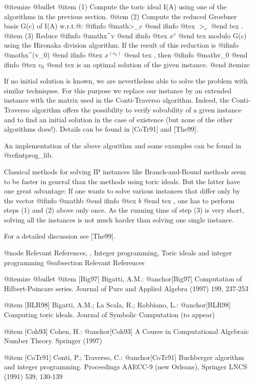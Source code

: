 @itemize @bullet
@item (1) Compute the toric ideal I(A) using one of the algorithms in the previous section.
@item (2) Compute the reduced Groebner basis G(c) of I(A) w.r.t.@: 
@ifinfo
@math{>_c}
@end ifinfo
@tex
$>_c$
@end tex
.
@item (3) Reduce 
@ifinfo
@math{x^v}
@end ifinfo
@tex
$x^v$
@end tex
 modulo G(c) using the Hironaka division algorithm.
If the result of this reduction is 
@ifinfo
@math{x^(v_0)}
@end ifinfo
@tex
$x^(v_0)$
@end tex
, then 
@ifinfo
@math{v_0}
@end ifinfo
@tex
$v_0$
@end tex
 is an optimal
solution of the given instance.
@end itemize

If no initial solution is known, we are nevertheless able to solve the
problem with similar techniques. For this purpose we replace our
instance by an extended instance with the matrix used
in the Conti-Traverso algorithm. Indeed, the Conti-Traverso
algorithm offers the possibility to verify solvability of a given
instance and to find an initial solution in the case of existence (but
none of the other algorithms does!). Details can be found in [CoTr91]
and [The99].

An implementation of the above algorithm and some examples can be found in @ref{intprog_lib}.

Classical methods for solving IP instances like Branch-and-Bound
methods seem to be faster in general than the methods using toric
ideals. But the latter have one great advantage: If one wants to solve
various instances that differ only by the vector 
@ifinfo
@math{b}
@end ifinfo
@tex
$b$
@end tex
, one has to
perform steps (1) and (2) above only once. As the running time of step (3)
is very short, solving all the instances is not much harder than
solving one single instance.

For a detailed discussion see [The99].

@node Relevant References, , Integer programming, Toric ideals and integer programming
@subsection Relevant References

@itemize @bullet
@item [Big97]  Bigatti, A.M.: @anchor{[Big97]}
   Computation of Hilbert-Poincare series.
   Journal of Pure and Applied Algebra (1997) 199, 237-253

@item [BLR98]  Bigatti, A.M.; La Scala, R.; Robbiano, L.: @anchor{[BLR98]}
   Computing toric ideals.
   Journal of Symbolic Computation (to appear)

@item [Coh93]  Cohen, H.: @anchor{[Coh93]}
   A Course in Computational Algebraic Number Theory.
   Springer (1997)

@item [CoTr91]  Conti, P.; Traverso, C.: @anchor{[CoTr91]}
   Buchberger algorithm and integer programming.
   Proceedings AAECC-9 (new Orleans), Springer LNCS (1991) 539,
   130-139

